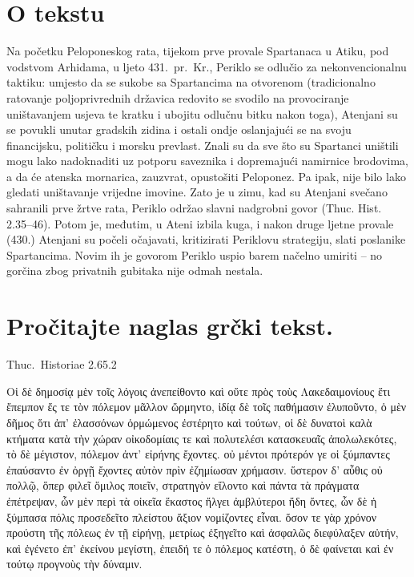 

\section*{O tekstu}

Na početku Peloponeskog rata, tijekom prve provale Spartanaca u Atiku, pod vodstvom Arhidama, u ljeto 431.\ pr.~Kr., Periklo se odlučio za nekonvencionalnu taktiku: umjesto da se sukobe sa Spartancima na otvorenom (tradicionalno ratovanje poljoprivrednih državica redovito se svodilo na provociranje uništavanjem usjeva te kratku i ubojitu odlučnu bitku nakon toga), Atenjani su se povukli unutar gradskih zidina i ostali ondje oslanjajući se na svoju financijsku, političku i morsku prevlast. Znali su da sve što su Spartanci uništili mogu lako nadoknaditi uz potporu saveznika i dopremajući namirnice brodovima, a da će atenska mornarica, zauzvrat, opustošiti Peloponez. Pa ipak, nije bilo lako gledati uništavanje vrijedne imovine. Zato je u zimu, kad su Atenjani svečano sahranili prve žrtve rata, Periklo održao slavni nadgrobni govor (Thuc. Hist. 2.35–46). Potom je, međutim, u Ateni izbila kuga, i nakon druge ljetne provale (430.) Atenjani su počeli očajavati, kritizirati Periklovu strategiju, slati poslanike Spartancima. Novim ih je govorom Periklo uspio barem načelno umiriti – no gorčina zbog privatnih gubitaka nije odmah nestala.


\section*{Pročitajte naglas grčki tekst.}

Thuc.\ Historiae 2.65.2


\medskip

\begin{greek}
{\large
{ \noindent Oἱ δὲ δημοσίᾳ μὲν τοῖς λόγοις ἀνεπείθοντο καὶ οὔτε πρὸς τοὺς Λακεδαιμονίους ἔτι ἔπεμπον ἔς τε τὸν πόλεμον μᾶλλον ὥρμηντο, ἰδίᾳ δὲ τοῖς παθήμασιν ἐλυποῦντο, ὁ μὲν δῆμος ὅτι ἀπ' ἐλασσόνων ὁρμώμενος ἐστέρητο καὶ τούτων, οἱ δὲ δυνατοὶ καλὰ κτήματα κατὰ τὴν χώραν οἰκοδομίαις τε καὶ πολυτελέσι κατασκευαῖς ἀπολωλεκότες, τὸ δὲ μέγιστον, πόλεμον ἀντ' εἰρήνης ἔχοντες. οὐ μέντοι πρότερόν γε οἱ ξύμπαντες ἐπαύσαντο ἐν ὀργῇ ἔχοντες αὐτὸν πρὶν ἐζημίωσαν χρήμασιν. ὕστερον δ' αὖθις οὐ πολλῷ, ὅπερ φιλεῖ ὅμιλος ποιεῖν, στρατηγὸν εἵλοντο καὶ πάντα τὰ πράγματα ἐπέτρεψαν, ὧν μὲν περὶ τὰ οἰκεῖα ἕκαστος ἤλγει ἀμβλύτεροι ἤδη ὄντες, ὧν δὲ ἡ ξύμπασα πόλις προσεδεῖτο πλείστου ἄξιον νομίζοντες εἶναι. ὅσον τε γὰρ χρόνον προύστη τῆς πόλεως ἐν τῇ εἰρήνῃ, μετρίως ἐξηγεῖτο καὶ ἀσφαλῶς διεφύλαξεν αὐτήν, καὶ ἐγένετο ἐπ' ἐκείνου μεγίστη, ἐπειδή τε ὁ πόλεμος κατέστη, ὁ δὲ φαίνεται καὶ ἐν τούτῳ προγνοὺς τὴν δύναμιν.

}
}
\end{greek}

